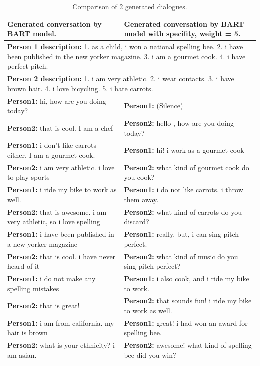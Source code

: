 \begin{table}[ht]
 \begin{tabular}{|p{7cm}|p{7cm}|}
 \hline\hline
 \textbf{Generated conversation by BART model.} & \textbf{Generated conversation by BART model with specifity, weight = 5.}\\
 \hline\hline
 \multicolumn{2}{|p{14cm}|}{\textbf{Person 1 description:} 1. as a child, i won a national spelling bee. 2. i have been published in the new yorker magazine. 3. i am a gourmet cook. 4. i have perfect pitch.} \\
 \hline
 \multicolumn{2}{|p{14cm}|}{\textbf{Person 2 description:} 1. i am very athletic. 2. i wear contacts. 3. i have brown hair. 4. i love bicycling. 5. i hate carrots.} \\
 \hline\hline
 \textbf{Person1:} hi, how are you doing today?  & \textbf{Person1:} (Silence) \\
 \textbf{Person2:} that is cool. I am a chef & \textbf{Person2:} hello , how are you doing today? \\ 
 \textbf{Person1:} i don't like carrots either. I am a gourmet cook. & \textbf{Person1:} hi! i work as a gourmet cook \\
 \textbf{Person2:} i am very athletic. i love to play sports & \textbf{Person2:} what kind of gourmet cook do you cook?\\
 \textbf{Person1:} i ride my bike to work as well. & \textbf{Person1:} i do not like carrots. i throw them away.\\
 \textbf{Person2:} that is awesome. i am very athletic, so i love spelling & \textbf{Person2:} what kind of carrots do you discard? \\
 \textbf{Person1:} i have been published in a new yorker magazine & \textbf{Person1:} really. but, i can sing pitch perfect.\\
 \textbf{Person2:} that is cool. i have never heard of it & \textbf{Person2:} what kind of music do you sing pitch perfect?\\
 \textbf{Person1:} i do not make any spelling mistakes & \textbf{Person1:} i also cook, and i ride my bike to work.\\
 \textbf{Person2:} that is great! & \textbf{Person2:} that sounds fun! i ride my bike to work as well. \\
 \textbf{Person1:} i am from california. my hair is brown & \textbf{Person1:} great! i had won an award for spelling bee. \\
 \textbf{Person2:} what is your ethnicity? i am asian. & \textbf{Person2:} awesome! what kind of spelling bee did you win?\\
 \hline\hline
 \end{tabular}
\caption{Comparison of 2 generated dialogues.}
\label{tab:compare_nidf}
\end{table}

